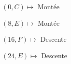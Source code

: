 \documentclass[preview]{standalone}
\begin{document}
\begin{center}
$(0,C) \mapsto$ Montée

$(8,E) \mapsto$ Montée

$(16,F) \mapsto$ Descente

$(24,E) \mapsto$ Descente
\end{center}
\end{document}
